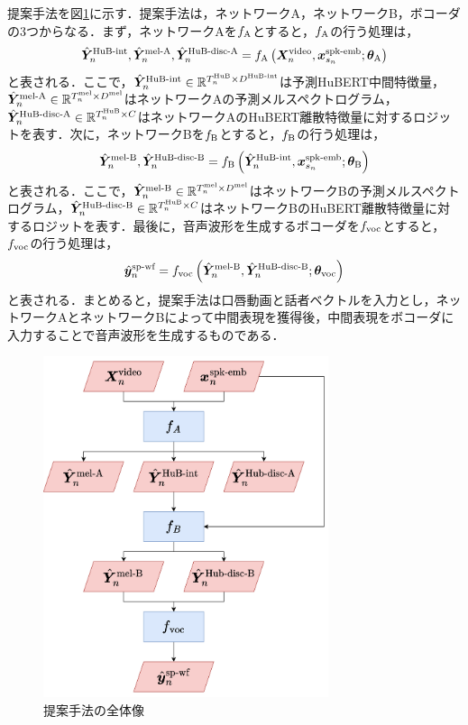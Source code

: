 提案手法を図\ref{sec4:fig:overview}に示す．提案手法は，ネットワークA，ネットワークB，ボコーダの3つからなる．まず，ネットワークAを$f_{\text{A}}$とすると，$f_{\text{A}}$の行う処理は，
\begin{equation}
    \label{sec4:eq:networkA_overview}
    \hubertIntPred, \melPredA, \hubertDiscPredA = \myNetworkA\lr{\video, \spkEmb; \weightA}
\end{equation}
と表される．ここで，$\hat{\bm{Y}}^{\text{HuB-int}}_{n} \in \mathbb{R}^{T^{\text{HuB}}_{n} \times D^{\text{HuB-int}}}$は予測HuBERT中間特徴量，$\hat{\bm{Y}}^{\text{mel-A}}_{n} \in \mathbb{R}^{T^{\text{mel}}_{n} \times D^{\text{mel}}}$はネットワークAの予測メルスペクトログラム，$\hat{\bm{Y}}^{\text{HuB-disc-A}}_{n} \in \mathbb{R}^{T^{\text{HuB}}_{n} \times C}$はネットワークAのHuBERT離散特徴量に対するロジットを表す．次に，ネットワークBを$f_{\text{B}}$とすると，$f_{\text{B}}$の行う処理は，
\begin{equation}
    \hat{\bm{Y}}^{\text{mel-B}}_{n}, \hat{\bm{Y}}^{\text{HuB-disc-B}}_{n} = f_{\text{B}}\left(\hat{\bm{Y}}^{\text{HuB-int}}_{n}, \bm{x}^{\text{spk-emb}}_{s_{n}}; \bm{\theta}_{\text{B}}\right)
\end{equation}
と表される．ここで，$\hat{\bm{Y}}^{\text{mel-B}}_{n} \in \mathbb{R}^{T^{\text{mel}}_{n} \times D^{\text{mel}}}$はネットワークBの予測メルスペクトログラム，$\hat{\bm{Y}}^{\text{HuB-disc-B}}_{n} \in \mathbb{R}^{T^{\text{HuB}}_{n} \times C}$はネットワークBのHuBERT離散特徴量に対するロジットを表す．最後に，音声波形を生成するボコーダを$f_{\text{voc}}$とすると，$f_{\text{voc}}$の行う処理は，
\begin{equation}
    \hat{\bm{y}}^{\text{sp-wf}}_{n} = f_{\text{voc}}\left(\hat{\bm{Y}}^{\text{mel-B}}_{n}, \hat{\bm{Y}}^{\text{HuB-disc-B}}_{n}; \bm{\theta}_{\text{voc}}\right)
\end{equation}
と表される．まとめると，提案手法は口唇動画と話者ベクトルを入力とし，ネットワークAとネットワークBによって中間表現を獲得後，中間表現をボコーダに入力することで音声波形を生成するものである．

\begin{figure}[bt]
    \centering
    \includegraphics[height=100mm]{./figure/sec4/model_2/overview.drawio.png}
    \caption{提案手法の全体像}
    \label{sec4:fig:overview}
\end{figure}

